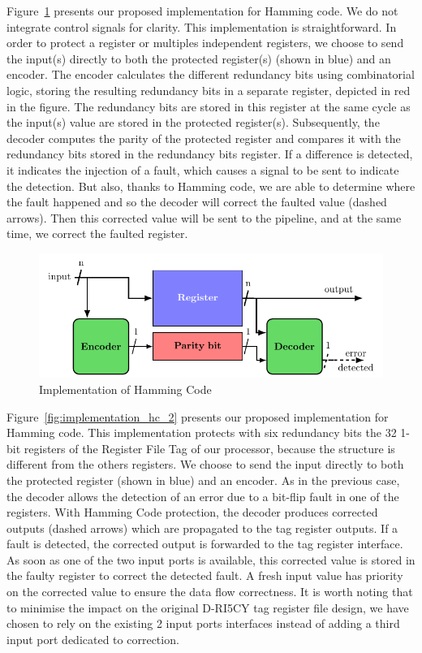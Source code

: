 Figure~\ref{fig:implementation_hc_1} presents our proposed implementation for Hamming code. We do not integrate control signals for clarity. This implementation is straightforward. In order to protect a register or multiples independent registers, we choose to send the input(s) directly to both the protected register(s) (shown in blue) and an encoder. The encoder calculates the different redundancy bits using combinatorial logic, storing the resulting redundancy bits in a separate register, depicted in red in the figure. The redundancy bits are stored in this register at the same cycle as the input(s) value are stored in the protected register(s). Subsequently, the decoder computes the parity of the protected register and compares it with the redundancy bits stored in the redundancy bits register. If a difference is detected, it indicates the injection of a fault, which causes a signal to be sent to indicate the detection. But also, thanks to Hamming code, we are able to determine where the fault happened and so the decoder will correct the faulted value (dashed arrows). Then this corrected value will be sent to the pipeline, and at the same time, we correct the faulted register.

\begin{figure}[ht]
    \centering
    \includegraphics[page=2, width=\textwidth]{c5_countermeasures_dift/img/archi_contremesures.pdf}
    \caption{Implementation of Hamming Code}
    \label{fig:implementation_hc_1}
\end{figure}

Figure~\ref{fig:implementation_hc_2} presents our proposed implementation for Hamming code. This implementation protects with six redundancy bits the 32 1-bit registers of the Register File Tag of our processor, because the structure is different from the others registers. We choose to send the input directly to both the protected register (shown in blue) and an encoder. 
As in the previous case, the decoder allows the detection of an error due to a bit-flip fault in one of the registers. With Hamming Code protection, the decoder produces corrected outputs (dashed arrows) which are propagated to the tag register outputs. If a fault is detected, the corrected output is forwarded to the tag register interface. As soon as one of the two input ports is available, this corrected value is stored in the faulty register to correct the detected fault. A fresh input value has priority on the corrected value to ensure the data flow correctness. It is worth noting that to minimise the impact on the original D-RI5CY tag register file design, we have chosen to rely on the existing 2 input ports interfaces instead of adding a third input port dedicated to correction.

